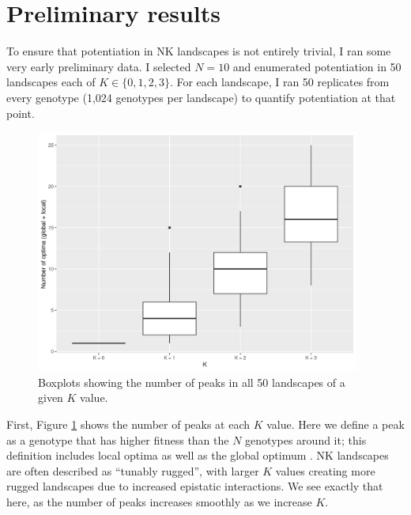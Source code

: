 \section{Preliminary results}

To ensure that potentiation in NK landscapes is not entirely trivial, I ran some very early preliminary data. 
I selected $N=10$ and enumerated potentiation in 50 landscapes each of $K \in \{0,1,2,3\}$.
For each landscape, I ran 50 replicates from every genotype (1,024 genotypes per landscape) to quantify potentiation at that point. 

\begin{figure}[h!]
    \centering
    \includegraphics[width=0.95\textwidth]{04_simplified_model/media/num_peaks.png}
    \caption{
        Boxplots showing the number of peaks in all 50 landscapes of a given $K$ value. 
    }
    \label{fig:simplified_model:num_peaks}
\end{figure}

First, Figure \ref{fig:simplified_model:num_peaks} shows the number of peaks at each $K$ value. 
Here we define a peak as a genotype that has higher fitness than the $N$ genotypes around it; this definition includes local optima as well as the global optimum \citep{ostmanPredictingEvolutionVisualizing2014}. 
NK landscapes are often described as ``tunably rugged'', with larger $K$ values creating more rugged landscapes due to increased epistatic interactions. 
We see exactly that here, as the number of peaks increases smoothly as we increase $K$. 


